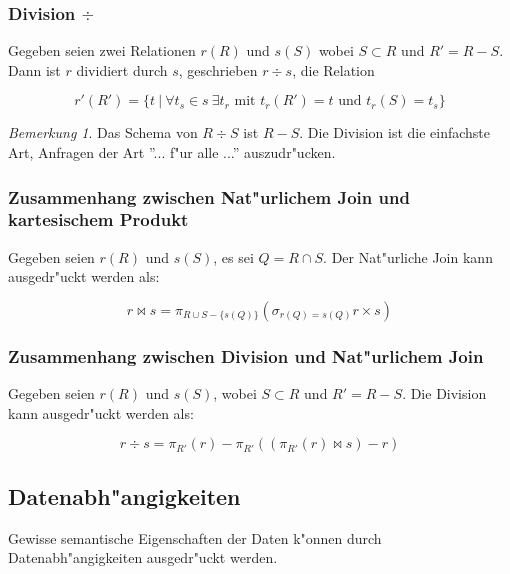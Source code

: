 \documentclass[german, 10pt, a4paper, twocolumn]{scrartcl}
\theoremstyle{definition}
\theoremstyle{remark}
\newtheorem*{remark}{Bemerkung}
\theoremstyle{example}
\begin{document}
\subsubsection{Division $\div$}

Gegeben seien zwei Relationen $r(R)$ und $s(S)$ wobei $S \subset R$ und $R' = R-S$. Dann ist $r$ dividiert durch $s$, geschrieben $r\div s$, die Relation

\begin{displaymath}
	r'(R') = \{ t \ | \ \forall t_s \in s \ \exists t_r \text{ mit } t_r(R') = t \text{ und } t_r(S) = t_s \}
\end{displaymath}

\begin{remark}
	Das Schema von $R\div S$ ist $R - S$. Die Division ist die einfachste Art, Anfragen der Art ''... f"ur alle ...'' auszudr"ucken.
\end{remark}


\subsubsection{Zusammenhang zwischen Nat"urlichem Join und kartesischem Produkt}

Gegeben seien $r(R)$ und $s(S)$, es sei $Q = R \cap S$. Der Nat"urliche Join kann ausgedr"uckt werden als:

\begin{displaymath}
	r \bowtie s = \pi_{R\cup S - \{s(Q)\}} (\sigma_{r(Q) = s(Q)} r \times s)
\end{displaymath}


\subsubsection{Zusammenhang zwischen Division und Nat"urlichem Join}

Gegeben seien $r(R)$ und $s(S)$, wobei $S \subset R$ und $R' = R-S$. Die Division kann ausgedr"uckt werden als:

\begin{displaymath}
	r \div s = \pi_{R'}(r) - \pi_{R'}((\pi_{R'}(r) \bowtie s) - r)
\end{displaymath}


\subsection{Datenabh"angigkeiten}

Gewisse semantische Eigenschaften der Daten k"onnen durch Datenabh"angigkeiten ausgedr"uckt werden.
\end{document}
